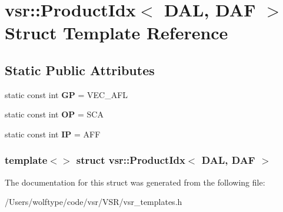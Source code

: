 \hypertarget{structvsr_1_1_product_idx_3_01_d_a_l_00_01_d_a_f_01_4}{\section{vsr\-:\-:Product\-Idx$<$ D\-A\-L, D\-A\-F $>$ Struct Template Reference}
\label{structvsr_1_1_product_idx_3_01_d_a_l_00_01_d_a_f_01_4}
}
\subsection*{Static Public Attributes}
\begin{DoxyCompactItemize}
\item 
\hypertarget{structvsr_1_1_product_idx_3_01_d_a_l_00_01_d_a_f_01_4_a0fe99b33bb69554e27e745601fc9479f}{static const int {\bfseries G\-P} = V\-E\-C\-\_\-\-A\-F\-L}\label{structvsr_1_1_product_idx_3_01_d_a_l_00_01_d_a_f_01_4_a0fe99b33bb69554e27e745601fc9479f}

\item 
\hypertarget{structvsr_1_1_product_idx_3_01_d_a_l_00_01_d_a_f_01_4_a134102051ace23aeb9a50c386baa91bd}{static const int {\bfseries O\-P} = S\-C\-A}\label{structvsr_1_1_product_idx_3_01_d_a_l_00_01_d_a_f_01_4_a134102051ace23aeb9a50c386baa91bd}

\item 
\hypertarget{structvsr_1_1_product_idx_3_01_d_a_l_00_01_d_a_f_01_4_afc8f6089c8e77c3cdc5b796243fe6253}{static const int {\bfseries I\-P} = A\-F\-F}\label{structvsr_1_1_product_idx_3_01_d_a_l_00_01_d_a_f_01_4_afc8f6089c8e77c3cdc5b796243fe6253}

\end{DoxyCompactItemize}
\subsubsection*{template$<$$>$ struct vsr\-::\-Product\-Idx$<$ D\-A\-L, D\-A\-F $>$}



The documentation for this struct was generated from the following file\-:\begin{DoxyCompactItemize}
\item 
/\-Users/wolftype/code/vsr/\-V\-S\-R/vsr\-\_\-templates.\-h\end{DoxyCompactItemize}

